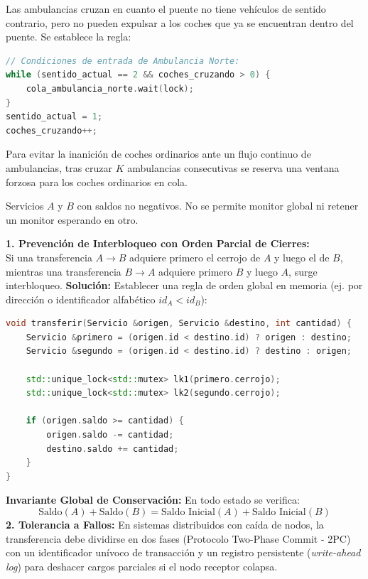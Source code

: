 \begin{solucion}
Las ambulancias cruzan en cuanto el puente no tiene vehículos de sentido contrario, pero no pueden expulsar a los coches que ya se encuentran dentro del puente. Se establece la regla:
\begin{lstlisting}[language=C++]
// Condiciones de entrada de Ambulancia Norte:
while (sentido_actual == 2 && coches_cruzando > 0) {
    cola_ambulancia_norte.wait(lock);
}
sentido_actual = 1;
coches_cruzando++;
\end{lstlisting}
Para evitar la inanición de coches ordinarios ante un flujo continuo de ambulancias, tras cruzar $K$ ambulancias consecutivas se reserva una ventana forzosa para los coches ordinarios en cola.
\end{solucion}

\begin{ejercicio}
Servicios $A$ y $B$ con saldos no negativos. No se permite monitor global ni retener un monitor esperando en otro.
\end{ejercicio}

\begin{solucion}
\textbf{1. Prevención de Interbloqueo con Orden Parcial de Cierres:}\\
Si una transferencia $A \to B$ adquiere primero el cerrojo de $A$ y luego el de $B$, mientras una transferencia $B \to A$ adquiere primero $B$ y luego $A$, surge interbloqueo.
\textbf{Solución:} Establecer una regla de orden global en memoria (ej. por dirección o identificador alfabético $id_A < id_B$):
\begin{lstlisting}[language=C++]
void transferir(Servicio &origen, Servicio &destino, int cantidad) {
    Servicio &primero = (origen.id < destino.id) ? origen : destino;
    Servicio &segundo = (origen.id < destino.id) ? destino : origen;

    std::unique_lock<std::mutex> lk1(primero.cerrojo);
    std::unique_lock<std::mutex> lk2(segundo.cerrojo);

    if (origen.saldo >= cantidad) {
        origen.saldo -= cantidad;
        destino.saldo += cantidad;
    }
}
\end{lstlisting}
\textbf{Invariante Global de Conservación:} En todo estado se verifica:
\[
\text{Saldo}(A) + \text{Saldo}(B) = \text{Saldo Inicial}(A) + \text{Saldo Inicial}(B)
\]
\textbf{2. Tolerancia a Fallos:} En sistemas distribuidos con caída de nodos, la transferencia debe dividirse en dos fases (Protocolo Two-Phase Commit - 2PC) con un identificador unívoco de transacción y un registro persistente (\emph{write-ahead log}) para deshacer cargos parciales si el nodo receptor colapsa.
\end{solucion}



